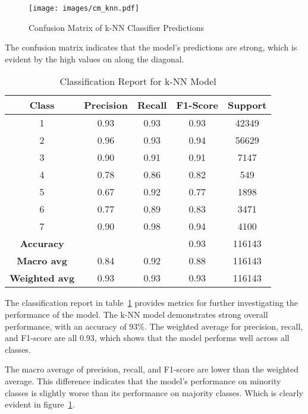 \documentclass[conference]{IEEEtran}
\begin{document}
\begin{figure}[H]
    \centering
    \texttt{[image: images/cm\_knn.pdf]}
    \caption{Confusion Matrix of k-NN Classifier Predictions}
    \label{fig:cm_knn}
\end{figure}

The confusion matrix indicates that the model's predictions are strong, which is evident by the high values on along the diagonal.

\begin{table}[H]
    \centering
    \caption{Classification Report for k-NN Model}
    \label{tab:class_rep_knn}
    \begin{tabular}{ccccc}
        \toprule
        \textbf{Class} & \textbf{Precision} & \textbf{Recall} & \textbf{F1-Score} & \textbf{Support} \\
        \midrule
        1 & 0.93 & 0.93 & 0.93 & 42349 \\
        2 & 0.96 & 0.93 & 0.94 & 56629 \\
        3 & 0.90 & 0.91 & 0.91 & 7147 \\
        4 & 0.78 & 0.86 & 0.82 & 549 \\
        5 & 0.67 & 0.92 & 0.77 & 1898 \\
        6 & 0.77 & 0.89 & 0.83 & 3471 \\
        7 & 0.90 & 0.98 & 0.94 & 4100 \\
        \midrule
        \textbf{Accuracy} &  &  & 0.93 & 116143 \\
        \textbf{Macro avg} & 0.84 & 0.92 & 0.88 & 116143 \\
        \textbf{Weighted avg} & 0.93 & 0.93 & 0.93 & 116143 \\
        \bottomrule
    \end{tabular}
\end{table}

The classification report in table~\ref{tab:class_rep_knn} provides metrics for further investigating the performance of the model. The k-NN model demonstrates strong overall performance, with an accuracy of 93\%. The weighted average for precision, recall, and F1-score are all 0.93, which shows that the model performs well across all classes.

The macro average of precision, recall, and F1-score are lower than the weighted average. This difference indicates that the model's performance on minority classes is slightly worse than its performance on majority classes. Which is clearly evident in figure~\ref{fig:cm_knn}.
\end{document}
